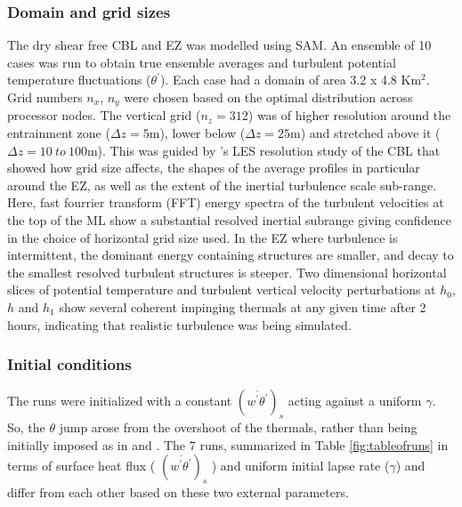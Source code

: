 \subsubsection{Domain and grid sizes}
The dry shear free CBL and EZ was modelled using SAM.  An ensemble of 10 cases was run to obtain true ensemble averages and turbulent potential temperature fluctuations ($\theta^{'}$). Each case had a domain of area 3.2 x 4.8 Km$^{2}$.  Grid numbers $n_{x}$, $n_{y}$ were chosen based on the optimal distribution across processor nodes. The vertical grid ($n_{z}=312$) was of higher resolution around the entrainment zone ($\Delta z = 5$m), lower below ($\Delta z = 25$m) and stretched above it ($\Delta z = 10 \ to \ 100 $m). This was guided by \cite{SullPat}'s LES resolution study of the CBL that showed how grid size affects, the shapes of the average profiles in particular around the EZ, as well as the extent of the inertial turbulence scale sub-range. Here, fast fourrier transform (FFT) energy spectra of the turbulent velocities at the top of the ML show a substantial resolved inertial subrange giving confidence in the choice of horizontal grid size used. In the EZ where turbulence is intermittent, the dominant energy containing structures are smaller, and decay to the smallest resolved turbulent structures is steeper. Two dimensional horizontal slices of potential temperature and turbulent vertical velocity perturbations at $h_{0}$, $h$ and $h_{1}$ show several coherent impinging thermals at any given time after 2 hours, indicating that realistic turbulence was being simulated.\\


\subsubsection{Initial conditions}

The runs were initialized with a constant $(\overline{w^{'}\theta^{'}})_{s}$ acting against a uniform $\gamma$.  So, the  $\theta$ jump arose from the overshoot of the thermals, rather than being initially imposed as in \cite{SullMoengStev} and \cite{BrooksFowler2}.  The 7 runs, summarized in Table \ref{fig:tableofruns} in terms of surface heat flux ( $(\overline{w^{'}\theta^{'}})_{s}$ ) and uniform initial lapse rate ($\gamma$) and differ from each other based on these two external parameters.


